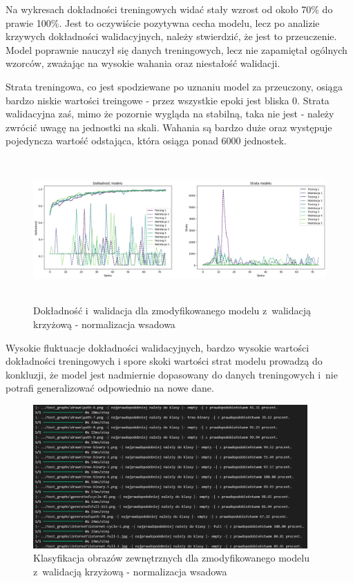 Na wykresach dokładności treningowych widać stały wzrost od około 70\% do prawie 100\%.
Jest to oczywiście pozytywna cecha modelu, lecz po analizie krzywych dokładności walidacyjnych,
należy stwierdzić, że jest to przeuczenie. Model poprawnie nauczył się danych treningowych,
lecz nie zapamiętał ogólnych wzorców, zważając na wysokie wahania oraz niestałość walidacji.

Strata treningowa, co jest spodziewane po uznaniu model za przeuczony,
osiąga bardzo niskie wartości treingowe - przez wszystkie epoki jest bliska 0.
Strata walidacyjna zaś, mimo że pozornie wygląda na stabilną, taka nie jest
- należy zwrócić uwagę na jednostki na skali. Wahania są bardzo duże oraz występuje pojedyncza wartość odstająca,
która osiąga ponad 6000 jednostek.

\begin{figure}[ht]
	\centering
	\includegraphics[height=5.5cm]{resources/tests/images/v4/crossvalid_2_img.png}
	\caption{Dokładność i~walidacja dla zmodyfikowanego modelu z~walidacją krzyżową - normalizacja wsadowa}
	\label{Fig:tests-cv-2a}
\end{figure}
\FloatBarrier

Wysokie fluktuacje dokładności walidacyjnych, bardzo wysokie wartości dokładności treningowych
i spore skoki wartości strat modelu prowadzą do konkluzji,
że model jest nadmiernie dopasowany do danych treningowych i~nie potrafi generalizować odpowiednio na nowe dane.

\begin{figure}[ht]
	\centering
	\includegraphics[height=5.5cm]{resources/tests/images/v4/crossvalid_2_txt.png}
	\caption{Klasyfikacja obrazów zewnętrznych dla zmodyfikowanego modelu z~walidacją krzyżową - normalizacja wsadowa}
	\label{Fig:tests-cv-2b}
\end{figure}
\FloatBarrier


